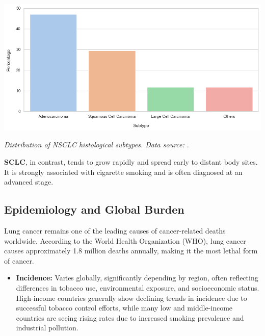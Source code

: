 \vspace{1em}
\begin{center}
    \includegraphics[width=1.00\textwidth]{../assets/01-overview/nsclc-dist.png}

    \small\textit{Distribution of NSCLC histological subtypes. Data source: \cite{nlm2025}}.
\end{center}
\vspace{1em}

\textbf{SCLC}, in contrast, tends to grow rapidly and spread early to distant body sites. It is 
strongly associated with cigarette smoking and is often diagnosed at an advanced stage.


\subsection{Epidemiology and Global Burden}

Lung cancer remains one of the leading causes of cancer-related deaths worldwide. According to the 
World Health Organization (WHO), lung cancer causes approximately 1.8 million deaths annually, 
making it the most lethal form of cancer. \cite{who2024}

\begin{itemize}
    \item \textbf{Incidence:} Varies globally, significantly depending by region, often reflecting 
    differences in tobacco use, environmental exposure, and socioeconomic status. High-income 
    countries generally show declining trends in incidence due to successful tobacco control 
    efforts, while many low and middle-income countries are seeing rising rates due to increased 
    smoking prevalence and industrial pollution.
\end{itemize}

